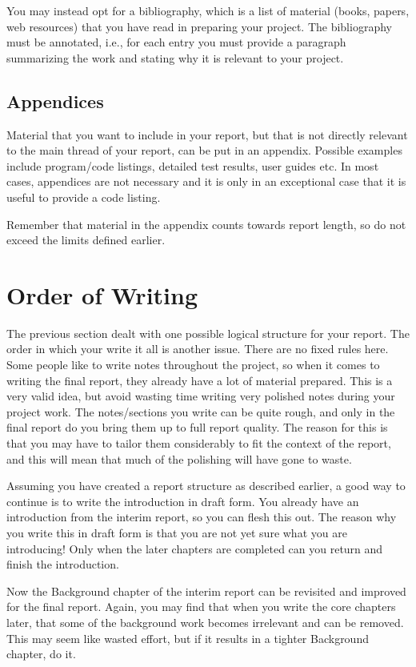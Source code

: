 \documentclass[]{final_report}
\begin{document}
You may instead opt for a bibliography, which is a list of material (books, papers, web resources) that you have read in preparing your project. The bibliography must be annotated, i.e., for each entry you must provide a paragraph summarizing the work and stating why it is relevant to your project.

\subsection{Appendices}

Material that you want to include in your report, but that is not directly relevant to the main thread of your report, can be put in an appendix. Possible examples include program/code listings, detailed test results, user guides etc. In most cases, appendices are not necessary and it is only in an exceptional case that it is useful to provide a code listing.

Remember that material in the appendix counts towards report length, so do not exceed the limits defined earlier.


\section{Order of Writing}

The previous section dealt with one possible logical structure for your report. The order in which your write it all is another issue. There are no fixed rules here. Some people like to write notes throughout the project, so when it comes to writing the final report, they already have a lot of material prepared. This is a very valid idea, but avoid wasting time writing very polished notes during your project work. The notes/sections you write can be quite rough, and only in the final report do you bring them up to full report quality. The reason for this is that you may have to tailor them considerably to fit the context of the report, and this will mean that much of the polishing will have gone to waste.

Assuming you have created a report structure as described earlier, a good way to continue is to write the introduction in draft form. You already have an introduction from the interim report, so you can flesh this out. The reason why you write this in draft form is that you are not yet sure what you are introducing! Only when the later chapters are completed can you return and finish the introduction.

Now the Background chapter of the interim report can be revisited and improved for the final report. Again, you may find that when you write the core chapters later, that some of the background work becomes irrelevant and can be removed. This may seem like wasted effort, but if it results in a tighter Background chapter, do it.
\end{document}
